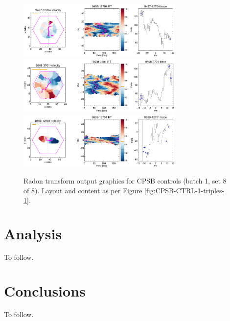 \documentclass[fleqn,usenatbib]{mnras}
\begin{document}
\begin{figure}
    \centering
    \includegraphics[width=0.73\textwidth]{Images/SN1-MC250/CPSB-CTRL-1-triples/9497-12704-1-250-10.png}
    \includegraphics[width=0.73\textwidth]{Images/SN1-MC250/CPSB-CTRL-1-triples/9508-3701-1-250-10.png}
    \includegraphics[width=0.73\textwidth]{Images/SN1-MC250/CPSB-CTRL-1-triples/9869-12701-1-250-10.png}    
    \caption{Radon transform output graphics for CPSB controls (batch 1, set 8 of 8). Layout and content as per Figure \ref{fig:CPSB-CTRL-1-triples-1}.}
    \label{fig:CPSB-CTRL-1-triples-8}
\end{figure}


\section{Analysis}
\label{sec:analysis}

To follow.

\section{Conclusions}
\label{sec:conclusions}

To follow.




\end{document}
